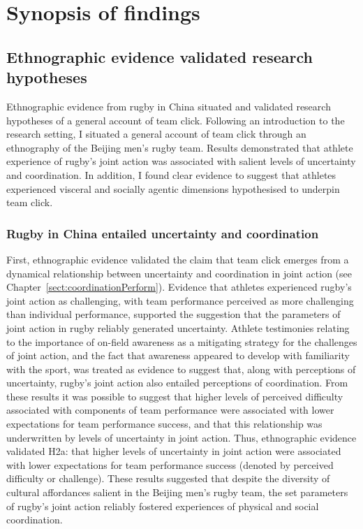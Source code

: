 
\section{Synopsis of findings}

\subsection{Ethnographic evidence validated research hypotheses}
Ethnographic evidence from rugby in China situated and validated research hypotheses of a general account of team click.  Following an introduction to the research setting, I situated a general account of team click through an ethnography of the Beijing men's rugby team.   Results demonstrated that athlete experience of rugby's joint action was associated with salient levels of uncertainty and coordination.  In addition, I found clear evidence to suggest that athletes experienced visceral and socially agentic dimensions hypothesised to underpin team click.

\subsubsection{Rugby in China entailed uncertainty and coordination}
First, ethnographic evidence validated the claim that team click emerges from a dynamical relationship between uncertainty and coordination in joint action (see Chapter~\ref{sect:coordinationPerform}).  Evidence
that athletes experienced rugby's joint action as challenging, with team performance perceived as more challenging than individual performance, supported the suggestion that the parameters of joint action in rugby reliably generated uncertainty. Athlete testimonies relating to the importance of on-field awareness as a mitigating strategy for the challenges of joint action, and the fact that awareness appeared to develop with familiarity with the sport, was treated as evidence to suggest that, along with perceptions of uncertainty, rugby's joint action also entailed perceptions of coordination.  From these results it was possible to suggest that higher levels of perceived difficulty associated with components of team performance were associated with lower expectations for team performance success, and that this relationship was underwritten by levels of uncertainty in joint action.  Thus, ethnographic evidence validated H2a: that higher levels of uncertainty in joint action were associated with lower expectations for team performance success (denoted by perceived difficulty or challenge).  These results suggested that despite the diversity of cultural affordances salient in the Beijing men's rugby team, the set parameters of rugby's joint action reliably fostered experiences of physical and social coordination.

